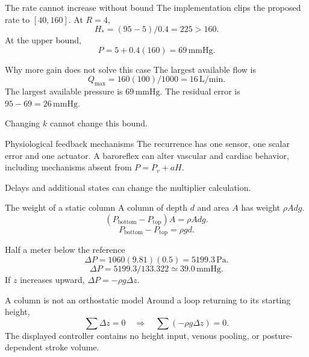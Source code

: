 \documentclass[aspectratio=169,11pt]{beamer}
\newcommand{\notestarget}{notes.pdf}\newcommand{\noteslabel}{Notes}
\begin{document}
\renewcommand{\notestarget}{notes.pdf\#note-an-attainable-target-and-a-saturated-controller}
\begin{frame}[t,fragile,label=slide-the-rate-cannot-increase-without-bound]{The rate cannot increase without bound}
The implementation clips the proposed rate to $[40,160]$.
\pause{}
At $R=4$,
\[H_*=(95-5)/0.4=225>160.\]
\pause{}
At the upper bound,
\[P=5+0.4(160)=69\,\mathrm{mmHg}.\]
\end{frame}
\renewcommand{\notestarget}{notes.pdf\#note-an-attainable-target-and-a-saturated-controller}
\begin{frame}[t,fragile,label=slide-why-more-gain-does-not-solve-this-case]{Why more gain does not solve this case}
The largest available flow is
\[Q_{\max}=160(100)/1000=16\,\mathrm{L/min}.\]
\pause{}
The largest available pressure is $69\,\mathrm{mmHg}$.
The residual error is $95-69=26\,\mathrm{mmHg}$.

Changing $k$ cannot change this bound.
\end{frame}
\renewcommand{\notestarget}{notes.pdf\#note-closing-the-pressure-loop}
\begin{frame}[t,fragile,label=slide-physiological-feedback-mechanisms]{Physiological feedback mechanisms}
The recurrence has one sensor, one scalar error and one actuator.
\pause{}
A baroreflex can alter vascular and cardiac behavior, including mechanisms absent from $P=P_v+aH$.

Delays and additional states can change the multiplier calculation.
\end{frame}
\renewcommand{\notestarget}{notes.pdf\#note-a-hydrostatic-pressure-difference}
\begin{frame}[t,fragile,label=slide-the-weight-of-a-static-column]{The weight of a static column}
A column of depth $d$ and area $A$ has weight $\rho Adg$.
\[(P_{\mathrm{bottom}}-P_{\mathrm{top}})A=\rho Adg.\]
\pause{}
\[\boxed{P_{\mathrm{bottom}}-P_{\mathrm{top}}=\rho gd}.\]
\end{frame}
\renewcommand{\notestarget}{notes.pdf\#note-a-hydrostatic-pressure-difference}
\begin{frame}[t,fragile,label=slide-half-a-meter-below-the-reference]{Half a meter below the reference}
\[\Delta P=1060(9.81)(0.5)=5199.3\,\mathrm{Pa}.\]
\pause{}
\[\Delta P=5199.3/133.322\simeq39.0\,\mathrm{mmHg}.\]
If $z$ increases upward, $\Delta P=-\rho g\Delta z$.
\end{frame}
\renewcommand{\notestarget}{notes.pdf\#note-a-hydrostatic-pressure-difference}
\begin{frame}[t,fragile,label=slide-a-column-is-not-an-orthostatic-model]{A column is not an orthostatic model}
Around a loop returning to its starting height,
\[\sum \Delta z=0\quad\Longrightarrow\quad\sum(-\rho g\Delta z)=0.\]
\pause{}
The displayed controller contains no height input, venous pooling, or posture-dependent stroke volume.
\end{frame}
\end{document}
